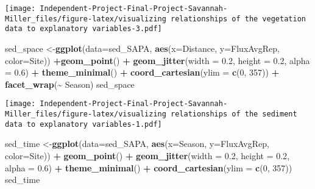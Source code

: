 \documentclass[
]{article}
\newenvironment{Shaded}{\begin{snugshade}}{\end{snugshade}}
\newcommand{\AttributeTok}[1]{\textcolor[rgb]{0.13,0.29,0.53}{#1}}
\newcommand{\DecValTok}[1]{\textcolor[rgb]{0.00,0.00,0.81}{#1}}
\newcommand{\FloatTok}[1]{\textcolor[rgb]{0.00,0.00,0.81}{#1}}
\newcommand{\FunctionTok}[1]{\textcolor[rgb]{0.13,0.29,0.53}{\textbf{#1}}}
\newcommand{\NormalTok}[1]{#1}
\newcommand{\OtherTok}[1]{\textcolor[rgb]{0.56,0.35,0.01}{#1}}
\newcommand{\SpecialCharTok}[1]{\textcolor[rgb]{0.81,0.36,0.00}{\textbf{#1}}}
\begin{document}
\texttt{[image: Independent-Project-Final-Project-Savannah-Miller\_files/figure-latex/visualizing relationships of the vegetation data to explanatory variables-3.pdf]}

\begin{Shaded}
\begin{Highlighting}[]
\NormalTok{sed\_space }\OtherTok{\textless{}{-}}\FunctionTok{ggplot}\NormalTok{(}\AttributeTok{data=}\NormalTok{sed\_SAPA, }\FunctionTok{aes}\NormalTok{(}\AttributeTok{x=}\NormalTok{Distance, }\AttributeTok{y=}\NormalTok{FluxAvgRep, }\AttributeTok{color=}\NormalTok{Site)) }\SpecialCharTok{+}\FunctionTok{geom\_point}\NormalTok{() }\SpecialCharTok{+} \FunctionTok{geom\_jitter}\NormalTok{(}\AttributeTok{width =} \FloatTok{0.2}\NormalTok{, }\AttributeTok{height =} \FloatTok{0.2}\NormalTok{, }\AttributeTok{alpha =} \FloatTok{0.6}\NormalTok{) }\SpecialCharTok{+} \FunctionTok{theme\_minimal}\NormalTok{() }\SpecialCharTok{+}
 \FunctionTok{coord\_cartesian}\NormalTok{(}\AttributeTok{ylim =} \FunctionTok{c}\NormalTok{(}\DecValTok{0}\NormalTok{, }\DecValTok{357}\NormalTok{)) }\SpecialCharTok{+} \FunctionTok{facet\_wrap}\NormalTok{(}\SpecialCharTok{\textasciitilde{}}\NormalTok{ Season)}
\NormalTok{sed\_space}
\end{Highlighting}
\end{Shaded}

\texttt{[image: Independent-Project-Final-Project-Savannah-Miller\_files/figure-latex/visualizing relationships of the sediment data to explanatory variables-1.pdf]}

\begin{Shaded}
\begin{Highlighting}[]
\NormalTok{sed\_time }\OtherTok{\textless{}{-}}\FunctionTok{ggplot}\NormalTok{(}\AttributeTok{data=}\NormalTok{sed\_SAPA, }\FunctionTok{aes}\NormalTok{(}\AttributeTok{x=}\NormalTok{Season, }\AttributeTok{y=}\NormalTok{FluxAvgRep, }\AttributeTok{color=}\NormalTok{Site)) }\SpecialCharTok{+} \FunctionTok{geom\_point}\NormalTok{() }\SpecialCharTok{+} \FunctionTok{geom\_jitter}\NormalTok{(}\AttributeTok{width =} \FloatTok{0.2}\NormalTok{, }\AttributeTok{height =} \FloatTok{0.2}\NormalTok{, }\AttributeTok{alpha =} \FloatTok{0.6}\NormalTok{) }\SpecialCharTok{+} \FunctionTok{theme\_minimal}\NormalTok{() }\SpecialCharTok{+}
 \FunctionTok{coord\_cartesian}\NormalTok{(}\AttributeTok{ylim =} \FunctionTok{c}\NormalTok{(}\DecValTok{0}\NormalTok{, }\DecValTok{357}\NormalTok{))}
\NormalTok{sed\_time}
\end{Highlighting}
\end{Shaded}
\end{document}
